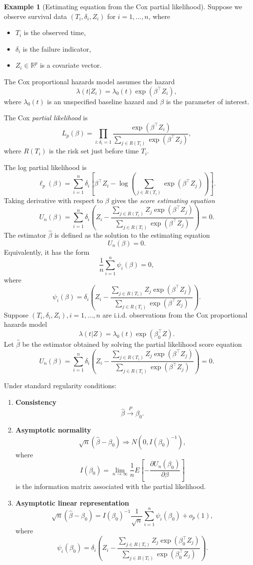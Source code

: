 \documentclass[11pt]{article}
\theoremstyle{definition}
\newtheorem{exmp}{Example}[section]
\begin{document}
\begin{exmp}[Estimating equation from the Cox partial likelihood]
Suppose we observe survival data $(T_i,\delta_i,Z_i)$ for $i=1,\dots,n$, where
\begin{itemize}
\item $T_i$ is the observed time,
\item $\delta_i$ is the failure indicator,
\item $Z_i \in \mathbb{R}^p$ is a covariate vector.
\end{itemize}
The Cox proportional hazards model assumes the hazard
\[
\lambda(t|Z_i) = \lambda_0(t)\exp(\beta^\top Z_i),
\]
where $\lambda_0(t)$ is an unspecified baseline hazard and $\beta$ is the parameter of interest.

The Cox \emph{partial likelihood} is
\[
L_p(\beta)
=
\prod_{i:\delta_i=1}
\frac{\exp(\beta^\top Z_i)}
{\sum_{j\in R(T_i)} \exp(\beta^\top Z_j)},
\]
where $R(T_i)$ is the risk set just before time $T_i$.

The log partial likelihood is
\[
\ell_p(\beta)
=
\sum_{i=1}^n
\delta_i
\left[
\beta^\top Z_i
-
\log
\left(
\sum_{j\in R(T_i)} \exp(\beta^\top Z_j)
\right)
\right].
\]
Taking derivative with respect to $\beta$ gives the \emph{score estimating equation}
\[
U_n(\beta)
=
\sum_{i=1}^n
\delta_i
\left(
Z_i -
\frac{\sum_{j\in R(T_i)} Z_j \exp(\beta^\top Z_j)}
{\sum_{j\in R(T_i)} \exp(\beta^\top Z_j)}
\right)
=0 .
\]
The estimator $\hat{\beta}$ is defined as the solution to the estimating equation
\[
U_n(\beta)=0 .
\]
Equivalently, it has the form
\[
\frac{1}{n}\sum_{i=1}^n \psi_i(\beta)=0,
\]
where
\[
\psi_i(\beta)
=
\delta_i
\left(
Z_i -
\frac{\sum_{j\in R(T_i)} Z_j \exp(\beta^\top Z_j)}
{\sum_{j\in R(T_i)} \exp(\beta^\top Z_j)}
\right).
\]
Suppose $(T_i,\delta_i,Z_i), i=1,\dots,n$ are i.i.d. observations from the Cox
proportional hazards model
\[
\lambda(t|Z)=\lambda_0(t)\exp(\beta_0^\top Z).
\]
Let $\hat\beta$ be the estimator obtained by solving the partial likelihood
score equation
\[
U_n(\beta)=\sum_{i=1}^n
\delta_i
\left(
Z_i -
\frac{\sum_{j\in R(T_i)} Z_j \exp(\beta^\top Z_j)}
{\sum_{j\in R(T_i)} \exp(\beta^\top Z_j)}
\right)=0.
\]

Under standard regularity conditions:

\begin{enumerate}
\item \textbf{Consistency}
\[
\hat\beta \xrightarrow{P} \beta_0 .
\]

\item \textbf{Asymptotic normality}
\[
\sqrt{n}(\hat\beta-\beta_0)
\Rightarrow
N\!\left(0, I(\beta_0)^{-1}\right),
\]
where
\[
I(\beta_0)
=
\lim_{n\to\infty}\frac{1}{n}
E\!\left[-\frac{\partial U_n(\beta_0)}{\partial \beta}\right]
\]
is the information matrix associated with the partial likelihood.

\item \textbf{Asymptotic linear representation}
\[
\sqrt{n}(\hat\beta-\beta_0)
=
I(\beta_0)^{-1}
\frac{1}{\sqrt{n}}
\sum_{i=1}^n
\psi_i(\beta_0)
+o_p(1),
\]
where
\[
\psi_i(\beta_0)
=
\delta_i
\left(
Z_i -
\frac{\sum_{j\in R(T_i)} Z_j \exp(\beta_0^\top Z_j)}
{\sum_{j\in R(T_i)} \exp(\beta_0^\top Z_j)}
\right).
\]
\end{enumerate}
\end{exmp}
\end{document}
